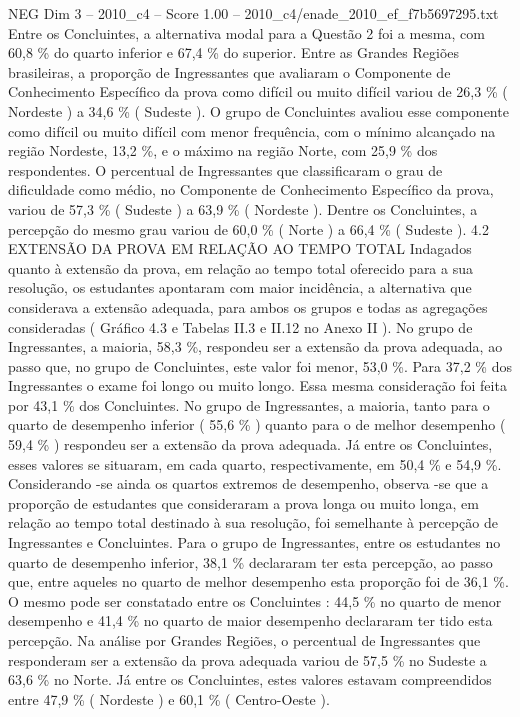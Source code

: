 \begin{textsample}{NEG Dim 3 – 2010\_c4 – Score 1.00 – 2010\_c4/enade\_2010\_ef\_f7b5697295.txt}
Entre os Concluintes, a alternativa modal para a Questão 2 foi a mesma, com 60,8 \% do quarto inferior e 67,4 \% do superior.
Entre as Grandes Regiões brasileiras, a proporção de Ingressantes que avaliaram o Componente de Conhecimento Específico da prova como difícil ou muito difícil variou de 26,3 \% ( Nordeste ) a 34,6 \% ( Sudeste ).
O grupo de Concluintes avaliou esse componente como difícil ou muito difícil com menor frequência, com o mínimo alcançado na região Nordeste, 13,2 \%, e o máximo na região Norte, com 25,9 \% dos respondentes.
O percentual de Ingressantes que classificaram o grau de dificuldade como médio, no Componente de Conhecimento Específico da prova, variou de 57,3 \% ( Sudeste ) a 63,9 \% ( Nordeste ).
Dentre os Concluintes, a percepção do mesmo grau variou de 60,0 \% ( Norte ) a 66,4 \% ( Sudeste ). 4.2 EXTENSÃO DA PROVA EM RELAÇÃO AO TEMPO TOTAL Indagados quanto à extensão da prova, em relação ao tempo total oferecido para a sua resolução, os estudantes apontaram com maior incidência, a alternativa que considerava a extensão adequada, para ambos os grupos e todas as agregações consideradas ( Gráfico 4.3 e Tabelas II.3 e II.12 no Anexo II ).
No grupo de Ingressantes, a maioria, 58,3 \%, respondeu ser a extensão da prova adequada, ao passo que, no grupo de Concluintes, este valor foi menor, 53,0 \%.
Para 37,2 \% dos Ingressantes o exame foi longo ou muito longo.
Essa mesma consideração foi feita por 43,1 \% dos Concluintes.
No grupo de Ingressantes, a maioria, tanto para o quarto de desempenho inferior ( 55,6 \% ) quanto para o de melhor desempenho ( 59,4 \% ) respondeu ser a extensão da prova adequada.
Já entre os Concluintes, esses valores se situaram, em cada quarto, respectivamente, em 50,4 \% e 54,9 \%.
Considerando -se ainda os quartos extremos de desempenho, observa -se que a proporção de estudantes que consideraram a prova longa ou muito longa, em relação ao tempo total destinado à sua resolução, foi semelhante à percepção de Ingressantes e Concluintes.
Para o grupo de Ingressantes, entre os estudantes no quarto de desempenho inferior, 38,1 \% declararam ter esta percepção, ao passo que, entre aqueles no quarto de melhor desempenho esta proporção foi de 36,1 \%.
O mesmo pode ser constatado entre os Concluintes : 44,5 \% no quarto de menor desempenho e 41,4 \% no quarto de maior desempenho declararam ter tido esta percepção.
Na análise por Grandes Regiões, o percentual de Ingressantes que responderam ser a extensão da prova adequada variou de 57,5 \% no Sudeste a 63,6 \% no Norte.
Já entre os Concluintes, estes valores estavam compreendidos entre 47,9 \% ( Nordeste ) e 60,1 \% ( Centro-Oeste ).

\end{textsample}
